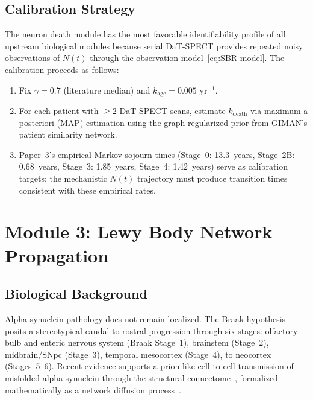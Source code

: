 \subsection{Calibration Strategy}

The neuron death module has the most favorable identifiability profile of all upstream biological modules because serial DaT-SPECT provides repeated noisy observations of $N(t)$ through the observation model~\eqref{eq:SBR-model}. The calibration proceeds as follows:

\begin{enumerate}
\item Fix $\gamma = 0.7$ (literature median) and $k_\text{age} = 0.005$ yr$^{-1}$.
\item For each patient with $\geq 2$ DaT-SPECT scans, estimate $k_\text{death}$ via maximum a posteriori (MAP) estimation using the graph-regularized prior from GIMAN's patient similarity network.
\item Paper~3's empirical Markov sojourn times (Stage~0: 13.3~years, Stage~2B: 0.68~years, Stage~3: 1.85~years, Stage~4: 1.42~years) serve as calibration targets: the mechanistic $N(t)$ trajectory must produce transition times consistent with these empirical rates.
\end{enumerate}


\section{Module 3: Lewy Body Network Propagation}
\label{sec:mech-propagation}

\subsection{Biological Background}

Alpha-synuclein pathology does not remain localized. The Braak hypothesis~\cite{braak2003} posits a stereotypical caudal-to-rostral progression through six stages: olfactory bulb and enteric nervous system (Braak Stage~1), brainstem (Stage~2), midbrain/SNpc (Stage~3), temporal mesocortex (Stage~4), to neocortex (Stages~5--6). Recent evidence supports a prion-like cell-to-cell transmission of misfolded alpha-synuclein through the structural connectome~\cite{brundin2010}, formalized mathematically as a network diffusion process~\cite{raj2012,fornari2019}.

